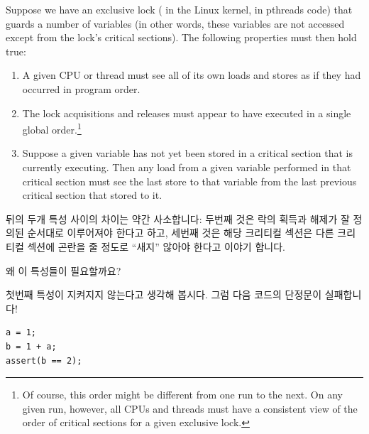 Suppose we have an exclusive lock ( in the Linux
kernel,  in pthreads code) that guards a number
of variables (in other words, these variables are not accessed except
from the lock's critical sections).
The following properties must then hold true:
\begin{enumerate}
\item	A given CPU or thread must see all of its own loads and stores
	as if they had occurred in program order.
\item	The lock acquisitions and releases must appear to have executed
	in a single global order.\footnote{
		Of course, this order might be different from one run
		to the next.
		On any given run, however, all CPUs and threads must
		have a consistent view of the order of critical sections
		for a given exclusive lock.}
\item	Suppose a given variable has not yet been stored in a
	critical section that is currently executing.
	Then any load from a given variable performed in that critical section
	must see the last store to that variable from the last previous
	critical section that stored to it.
\end{enumerate}
\fi

뒤의 두개 특성 사이의 차이는 약간 사소합니다:
두번째 것은 락의 획득과 해제가 잘 정의된 순서대로 이루어져야 한다고 하고,
세번째 것은 해당 크리티컬 섹션은 다른 크리티컬 섹션에 곤란을 줄 정도로 ``새지''
않아야 한다고 이야기 합니다.

왜 이 특성들이 필요할까요?

첫번째 특성이 지켜지지 않는다고 생각해 봅시다.
그럼 다음 코드의 단정문이 실패합니다!

\vspace{5pt}
\begin{minipage}[t]{\columnwidth}
\scriptsize
\begin{verbatim}
a = 1;
b = 1 + a;
assert(b == 2);
\end{verbatim}
\end{minipage}
\label{codesample:advsync:What Can You Count On? 1}
\vspace{5pt}

